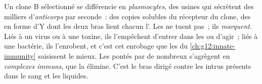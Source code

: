 \begin{proposition}\label{prop:g12:adaptive-immunity:antibodies}
Un clone B sélectionné se différencie en \emph{plasmocytes}, des
usines qui sécrètent des milliers d'\emph{anticorps}
par seconde~: des copies solubles du récepteur du clone, des 
en forme d'Y dont les deux bras lient chacun l'. Les 
ne tuent pas~; ils \emph{marquent}. Liés à un virus ou à une toxine,
ils l'empêchent d'entrer dans les  ou d'agir~; liés à une
bactérie, ils l'enrobent, et c'est cet enrobage que les  du
\cref{ch:g12:innate-immunity} saisissent le mieux. Les 
pontés par de nombreux  s'agrègent en \emph{complexes
immuns}, que la  élimine. C'est le bras dirigé contre les
intrus présents dans le sang et les liquides.
\end{proposition}
\admitted

